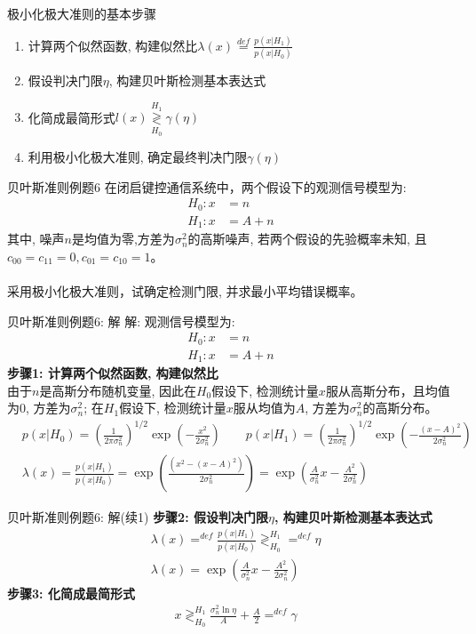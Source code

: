 \begin{frame}{极小化极大准则的基本步骤}
\begin{enumerate}
	\setlength{\itemsep}{.5cm}
	\item 计算两个似然函数, 构建似然比$\lambda(x)\mathop{=}\limits^{def}\frac{p(x|H_1)}{p(x|H_0)}$
	\item 假设判决门限$\eta$, 构建贝叶斯检测基本表达式
	\item 化简成最简形式$l(x)\mathop{\gtrless}\limits_{H_0}^{H_1}\gamma(\eta)$
	\item 利用极小化极大准则, 确定最终判决门限$\gamma(\eta)$
\end{enumerate}
\end{frame}

\begin{frame}{贝叶斯准则例题6}
在闭启键控通信系统中，两个假设下的观测信号模型为:
\begin{align*}
H_0: x&=n  \\
H_1: x&=A+n
\end{align*}
其中, 噪声$n$是均值为零,方差为$\sigma_n^2$的高斯噪声,  若两个假设的先验概率未知, 且$c_{00}=c_{11}=0, c_{01}=c_{10}=1$。\\
~\\
采用极小化极大准则，试确定检测门限, 并求最小平均错误概率。
\end{frame}

\begin{frame}[shrink]{贝叶斯准则例题6: 解}
解: 观测信号模型为:
\begin{align*}
H_0: x&=n  \\
H_1: x&=A+n
\end{align*}
\textbf{步骤1: 计算两个似然函数, 构建似然比}\\
由于$n$是高斯分布随机变量, 因此在$H_0$假设下, 检测统计量$x$服从高斯分布，且均值为0, 方差为$\sigma_n^2$; 在$H_1$假设下, 检测统计量$x$服从均值为$A$, 方差为$\sigma_n^2$的高斯分布。
\begin{align*}
&p(x|H_0)=\left(\frac{1}{2\pi\sigma_n^2}\right)^{1/2}\exp\left(-\frac{x^2}{2\sigma_n^2}\right) \qquad p(x|H_1)=\left(\frac{1}{2\pi\sigma_n^2}\right)^{1/2}\exp\left(-\frac{(x-A)^2}{2\sigma_n^2}\right)\\
&\lambda(x)=\frac{p(x|H_1)}{p(x|H_0)}=\exp\left(\frac{(x^2-(x-A)^2)}{2\sigma_n^2}\right)=\exp\left(\frac{A}{\sigma_n^2}x-\frac{A^2}{2\sigma_n^2}\right)
\end{align*} 
\end{frame}

\begin{frame}[shrink]{贝叶斯准则例题6: 解(续1)}
\textbf{步骤2: 假设判决门限$\eta$, 构建贝叶斯检测基本表达式}
\begin{align*}
&\lambda(x)\mathop{=}^{def}\frac{p(x|H_1)}{p(x|H_0)}\mathop{\gtrless}_{H_0}^{H_1}\mathop{=}^{def}\eta\\
&\lambda(x)=\exp\left(\frac{A}{\sigma_n^2}x-\frac{A^2}{2\sigma_n^2}\right)
\end{align*} 
\textbf{步骤3: 化简成最简形式}
\begin{align*}
&x\mathop{\gtrless}_{H_0}^{H_1}\frac{\sigma_n^2\ln\eta}{A}+\frac{A}{2}\mathop{=}^{def}\gamma
\end{align*} 
\end{frame}


